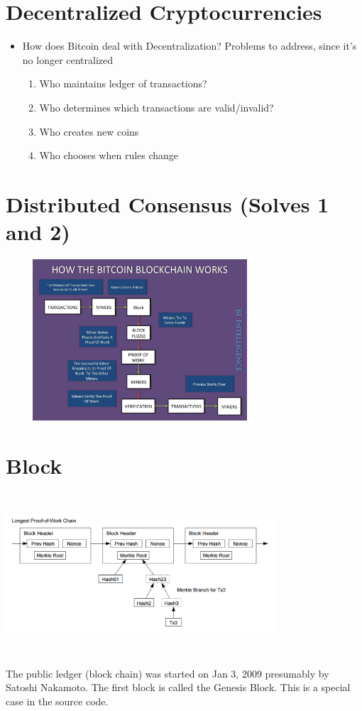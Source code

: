 \documentclass{article}
\begin{document}
\section*{Decentralized Cryptocurrencies}
\begin{itemize}
  \item How does Bitcoin deal with Decentralization?
    \subitem Problems to address, since it's no longer centralized
    \begin{enumerate}
      \item Who maintains ledger of transactions?
      \item Who determines which transactions are valid/invalid?
      \item Who creates new coins
      \item Who chooses when rules change
    \end{enumerate}
\end{itemize}

\section*{Distributed Consensus (Solves 1 and 2)}
\begin{center}
  \includegraphics[width=10cm, height=6cm]{process.jpg}
\end{center}
\section*{Block}
\begin{center}
  \includegraphics[width=10cm, height=6cm]{merkle.png}
\end{center}
The public ledger (block chain) was started on Jan 3, 2009 presumably by Satoshi Nakamoto. The first
block is called the Genesis Block. This is a special case in the source code.
\end{document}
